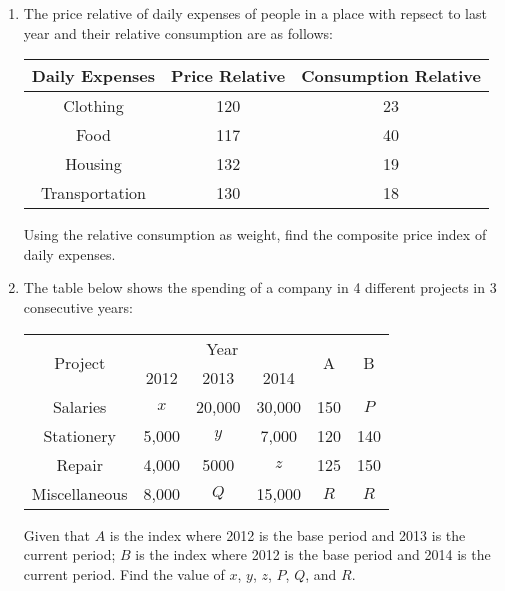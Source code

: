\documentclass{report}
\begin{document}
\begin{multicols}{2}
\begin{enumerate}
    \item The price relative of daily expenses of people in a place with repsect to last
          year and their relative consumption are as follows:
          \begin{center}
            \begin{tabular}{|c|c|c|}
              \hline
              Daily Expenses & Price Relative & Consumption Relative \\
              \hline
              Clothing       & 120            & 23                   \\
              Food           & 117            & 40                   \\
              Housing        & 132            & 19                   \\
              Transportation & 130            & 18                   \\
              \hline
            \end{tabular}
          \end{center}
          Using the relative consumption as weight, find the composite price index of daily expenses.

    \item The table below shows the spending of a company in 4 different projects in 3
          consecutive years:
          \begin{center}
            \begin{tabular}{|c|c|c|c|c|c|}
              \hline
              \multirow{2}{*}{Project} & \multicolumn{3}{c|}{Year} & \multirow{2}{*}{A} & \multirow{2}{*}{B}             \\
              \cline{2-4}
                                       & 2012                      & 2013               & 2014               &     &     \\
              \hline
              Salaries                 & $x$                       & 20,000             & 30,000             & 150 & $P$ \\
              Stationery               & 5,000                     & $y$                & 7,000              & 120 & 140 \\
              Repair                   & 4,000                     & 5000               & $z$                & 125 & 150 \\
              Miscellaneous            & 8,000                     & $Q$                & 15,000             & $R$ & $R$ \\
              \hline
            \end{tabular}
          \end{center}
          Given that $A$ is the index where 2012 is the base period and 2013 is the current period; $B$ is the index where 2012 is the base period and 2014 is the current period. Find the value of $x$, $y$, $z$, $P$, $Q$, and $R$.


\end{enumerate}
\end{multicols}
\end{document}
